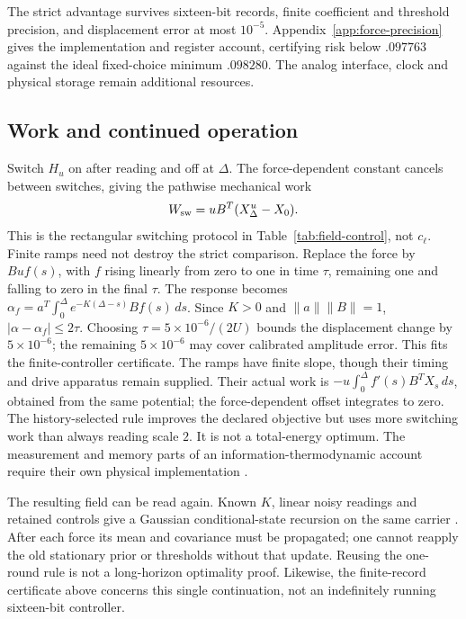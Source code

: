 \documentclass[12pt,a4paper]{article}
\begin{document}
The strict advantage survives sixteen-bit records, finite coefficient
and threshold precision, and displacement error at most $10^{-5}$.
Appendix~\ref{app:force-precision} gives the implementation and register
account, certifying risk below $.097763$ against the ideal fixed-choice
minimum $.098280$. The analog interface, clock and physical storage
remain additional resources.

\subsection{Work and continued operation}

Switch $H_u$ on after reading and off at $\Delta$. The
force-dependent constant cancels between switches, giving the
pathwise mechanical work
\begin{equation}\label{eq:field-switch-work}
 W_{\rm sw}=uB^T(X_\Delta^u-X_0).
\end{equation}
This is the rectangular switching protocol in
Table~\ref{tab:field-control}, not $c_\ell$.
Finite ramps need not destroy the strict comparison. Replace the
force by $Buf(s)$, with $f$ rising linearly from zero to one in time
$\tau$, remaining one and falling to zero in the final $\tau$.
The response becomes
$\alpha_f=a^T\int_0^\Delta e^{-K(\Delta-s)}Bf(s)\,ds$.
Since $K>0$ and $\|a\|\|B\|=1$,
$|\alpha-\alpha_f|\leq2\tau$. Choosing
$\tau=5\times10^{-6}/(2U)$ bounds the displacement change by
$5\times10^{-6}$; the remaining $5\times10^{-6}$ may cover calibrated
amplitude error. This fits the finite-controller certificate.
The ramps have finite slope, though their timing and drive apparatus
remain supplied. Their actual work is
$-u\int_0^\Delta f'(s)B^TX_s\,ds$, obtained from the same potential;
the force-dependent offset integrates to zero.
The history-selected rule improves the declared objective but uses
more switching work than always reading scale $2$. It is not a
total-energy optimum. The measurement and memory parts of an
information-thermodynamic account require their own physical
implementation \cite{SagawaUeda2010}.

The resulting field can be read again. Known $K$, linear noisy
readings and retained controls give a Gaussian conditional-state
recursion on the same carrier \cite{ImprintChain}. After each force
its mean and covariance must be propagated; one cannot reapply the
old stationary prior or thresholds without that update. Reusing the
one-round rule is not a long-horizon optimality proof. Likewise, the
finite-record certificate above concerns this single continuation,
not an indefinitely running sixteen-bit controller.
\end{document}
